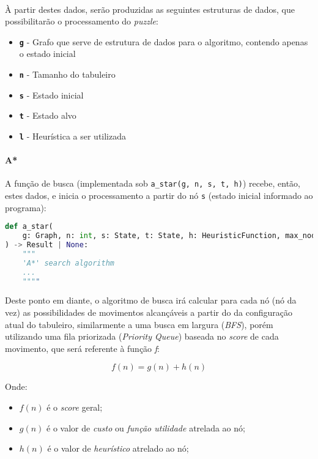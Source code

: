 \documentclass[12pt]{article}
\begin{document}
\paragraph{}
À partir destes dados, serão produzidas as seguintes estruturas de dados, que possibilitarão o processamento do \textit{puzzle}:

\begin{itemize}
\item \textbf{\texttt{g}} - Grafo que serve de estrutura de dados para o algoritmo, contendo apenas o estado inicial
\item \textbf{\texttt{n}} - Tamanho do tabuleiro
\item \textbf{\texttt{s}} - Estado inicial
\item \textbf{\texttt{t}} - Estado alvo
\item \textbf{\texttt{l}} - Heurística a ser utilizada
\end{itemize}

\paragraph{A*}
A função de busca (implementada sob \texttt{a\_star(g, n, s, t, h)}) recebe, então, estes dados, e inicia o
processamento a partir do nó \texttt{s} (estado inicial informado ao programa):

\begin{lstlisting}[language=python]
def a_star(
    g: Graph, n: int, s: State, t: State, h: HeuristicFunction, max_nodes: int = 400_000
) -> Result | None:
    """
    'A*' search algorithm
    ...
    """"
\end{lstlisting}

Deste ponto em diante, o algoritmo de busca irá calcular para cada nó (nó da vez) as possibilidades de movimentos
alcançáveis a partir do da configuração atual do tabuleiro, similarmente a uma busca em largura (\textit{BFS}), porém
utilizando uma fila priorizada (\textit{Priority Queue}) baseada no \textit{score} de cada movimento, que será referente
à função \textit{f}:

\begin{displaymath}
f(n) = g(n) + h(n)
\end{displaymath}

Onde:
\begin{itemize}
  \item $f(n)$ é o \textit{score} geral;
  \item $g(n)$ é o valor de \textit{custo} ou \textit{função utilidade} atrelada ao nó;
  \item $h(n)$ é o valor de \textit{heurístico} atrelado ao nó;
\end{itemize}
\end{document}
